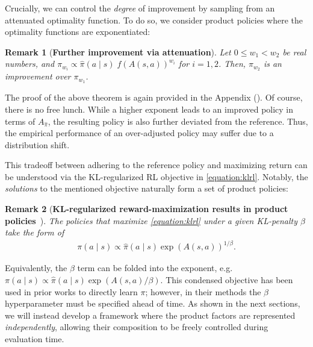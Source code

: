 \documentclass{article}
\newtheorem{remark}{Remark}
\begin{document}
Crucially, we can control the \textit{degree} of improvement by sampling from an attenuated optimality function. To do so, we consider product policies where the optimality functions are exponentiated:
\begin{remark}[\textbf{Further improvement via attenuation}]
    Let $0 \leq w_1 < w_2$ be real numbers, and $\pi_{w_i} \propto \hat{\pi}(a \mid s) \;f(A(s,a))^{w_i}$ for $i=1, 2$. Then, $\pi_{w_2}$ is an improvement over $\pi_{w_1}$.
    \label{thm:attenuation}
\end{remark}
The proof of the above theorem is again provided in the Appendix (). Of course, there is no free lunch. While a higher exponent leads to an improved policy in terms of $A_{\hat{\pi}}$, the resulting policy is also further deviated from the reference. Thus, the empirical performance of an over-adjusted policy may suffer due to a distribution shift.

This tradeoff between adhering to the reference policy and maximizing return can be understood via the KL-regularized RL objective in \cref{equation:klrl}. Notably, the \textit{solutions} to the mentioned objective naturally form a set of product policies:
\begin{remark}[\textbf{KL-regularized reward-maximization results in product policies}~\citep{awr_peng2019}]
    The policies that maximize \cref{equation:klrl} under a given KL-penalty $\beta$ take the form of
    \begin{align}
        \pi(a \mid s) \propto \hat{\pi}(a \mid s) \exp(A(s,a))^{1/\beta}.
    \end{align}
\end{remark}

Equivalently, the $\beta$ term can be folded into the exponent, e.g. $\pi(a \mid s)\propto \hat{\pi}(a \mid s)\exp(A(s,a)/\beta)$. This condensed objective has been used in prior works \citep{rwr_peters2007, awr_peng2019} to directly learn $\pi$; however, in their methods the $\beta$ hyperparameter must be specified ahead of time. As shown in the next sections, we will instead develop a framework where the product factors are represented \textit{independently}, allowing their composition to be freely controlled during evaluation time.
\end{document}
